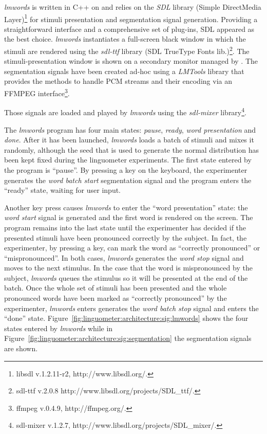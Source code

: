 \emph{lmwords} is written in C++ on and relies on the \emph{SDL} library (Simple
DirectMedia Layer)\footnote{libsdl v.1.2.11-r2, http://www.libsdl.org/.} 
for stimuli presentation and segmentation signal generation.
Providing a straightforward interface and a comprehensive set of plug-ins, 
SDL appeared as the best choice.
\emph{lmwords} instantiates a full-screen black window in which the stimuli are
rendered using the \emph{sdl-ttf} library (SDL TrueType Fonts
lib.)\footnote{sdl-ttf v.2.0.8 http://www.libsdl.org/projects/SDL\_ttf/.}.
The stimuli-presentation window is shown on a secondary monitor managed by
. The segmentation signals have been created ad-hoc using a
\emph{LMTools} library that provides the methods to handle PCM streams and their
encoding via an FFMPEG interface\footnote{ffmpeg v.0.4.9, http://ffmpeg.org/.}.

Those signals are loaded and played by \emph{lmwords} using the \emph{sdl-mixer}
library\footnote{sdl-mixer v.1.2.7,
http://www.libsdl.org/projects/SDL\_mixer/.}.

The \emph{lmwords} program has four main states: \emph{pause}, \emph{ready},
\emph{word presentation} and \emph{done}.
After it has been launched, \emph{lmwords} loads a batch of stimuli and mixes it
randomly, although the seed that is used to generate the normal distribution has
been kept fixed during the linguometer experiments.
The first state entered by the program is ``pause''. By pressing a key on
the  keyboard, the experimenter generates the \emph{word batch start}
segmentation signal and the program enters the ``ready'' state, waiting for
user input.


Another key press causes \emph{lmwords} to enter the ``word presentation''
state: the \emph{word start} signal is generated and the first word is 
rendered on the screen.
The program remains into the last state until the experimenter has decided if
the presented stimuli have been pronounced correctly by the subject.
In fact, the experimenter, by pressing a key, can mark the word as ``correctly
pronounced'' or ``mispronounced''. 
In both cases, \emph{lmwords} generates the \emph{word stop} signal and 
moves to the next stimulus.
In the case that the word is mispronounced by the subject, \emph{lmwords} queues
the stimulus so it will be presented at the end of the batch.
Once the whole set of stimuli has been presented and the whole pronounced words
have been marked as ``correctly pronounced'' by the experimenter,
\emph{lmwords} enters generates the \emph{word batch stop} signal and enters 
the ``done'' state.
Figure~\ref{fig:linguometer:architecture:sig:lmwords} shows the four
states entered by \emph{lmwords} while 
in Figure~\ref{fig:linguometer:architecture:sig:segmentation} the segmentation
signals are shown.
